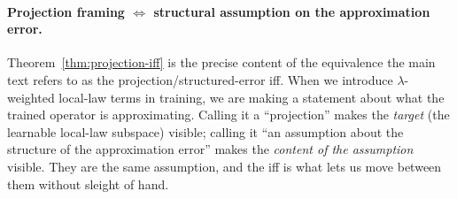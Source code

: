 \paragraph{Projection framing $\iff$ structural assumption on the approximation error.}
Theorem~\ref{thm:projection-iff} is the precise content of the
equivalence the main text refers to as the projection/structured-error
iff. When we introduce $\lambda$-weighted local-law terms in training,
we are making a statement about what the trained operator is
approximating. Calling it a ``projection'' makes the \emph{target} (the
learnable local-law subspace) visible; calling it ``an assumption about
the structure of the approximation error'' makes the \emph{content of
the assumption} visible. They are the same assumption, and the iff is
what lets us move between them without sleight of hand.
